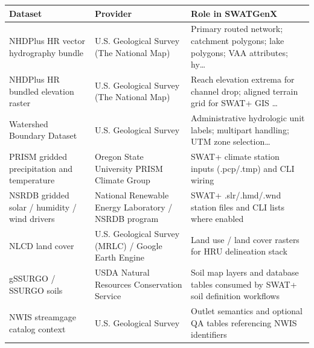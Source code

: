 \begin{tabular}{@{}llp{5.5cm}@{}}
\toprule
Dataset & Provider & Role in SWATGenX \\
\midrule
NHDPlus HR vector hydrography bundle & U.S. Geological Survey (The National Map) & Primary routed network; catchment polygons; lake polygons; VAA attributes; hy\ldots \\
NHDPlus HR bundled elevation raster & U.S. Geological Survey (The National Map) & Reach elevation extrema for channel drop; aligned terrain grid for SWAT+ GIS \ldots \\
Watershed Boundary Dataset & U.S. Geological Survey & Administrative hydrologic unit labels; multipart handling; UTM zone selection\ldots \\
PRISM gridded precipitation and temperature & Oregon State University PRISM Climate Group & SWAT+ climate station inputs (.pcp/.tmp) and CLI wiring \\
NSRDB gridded solar / humidity / wind drivers & National Renewable Energy Laboratory / NSRDB program & SWAT+ .slr/.hmd/.wnd station files and CLI lists where enabled \\
NLCD land cover & U.S. Geological Survey (MRLC) / Google Earth Engine & Land use / land cover rasters for HRU delineation stack \\
gSSURGO / SSURGO soils & USDA Natural Resources Conservation Service & Soil map layers and database tables consumed by SWAT+ soil definition workflows \\
NWIS streamgage catalog context & U.S. Geological Survey & Outlet semantics and optional QA tables referencing NWIS identifiers \\
\bottomrule
\end{tabular}
